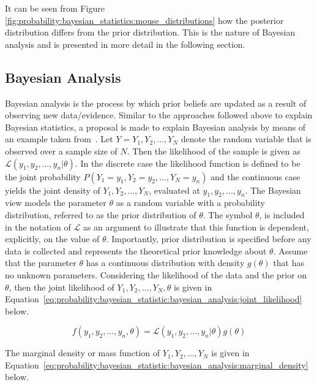 \noindent
It can be seen from Figure \ref{fig:probability:bayesian_statistics:mouse_distributions} how the posterior distribution differs from the prior distribution. This is the nature of Bayesian analysis and is presented in more detail in the following section.

\subsection{Bayesian Analysis}
\label{sec:probability:bayesian_statistics:bayesian_analysis}

Bayesian analysis is the process by which prior beliefs are updated as a result of observing new data/evidence. Similar to the approaches followed above to explain Bayesian statistics, a proposal is made to explain Bayesian analysis by means of an example taken from~\cite{ref:wackerly:2014}. Let $Y = Y_{1}, Y_{2}, \dots, Y_{N}$ denote the random variable that is observed over a sample size of $N$. Then the likelihood of the sample is given as $\mathcal{L}(y_{1}, y_{2}, \dots, y_{n} \vert \theta)$. In the discrete case the likelihood function is defined to be the joint probability $P(Y_{1} = y_{1}, Y_{2} = y_{2}, \dots, Y_{N} = y_{n})$ and the continuous case yields the joint density of $Y_{1}, Y_{2}, \dots, Y_{N}$, evaluated at $y_{1}, y_{2}, \dots, y_{n}$. The Bayesian view models the parameter $\theta$ as a random variable with a probability distribution, referred to as the prior distribution of $\theta$. The symbol $\theta$, is included in the notation of $\mathcal{L}$ as an argument to illustrate that this function is dependent, explicitly, on the value of $\theta$. Importantly, prior distribution is specified before any data is collected and represents the theoretical prior knowledge about $\theta$. Assume that the parameter $\theta$ has a continuous distribution with density $g(\theta)$ that has no unknown parameters. Considering the likelihood of the data and the prior on $\theta$, then the joint likelihood of $Y_{1}, Y_{2}, \dots, Y_{N}, \theta$ is given in Equation~\eqref{eq:probability:bayesian_statistic:bayesian_analysis:joint_likelihood} below.

\begin{equation}
      \label{eq:probability:bayesian_statistic:bayesian_analysis:joint_likelihood}
      f(y_{1}, y_{2}, \dots, y_{n}, \theta) = \mathcal{L}(y_{1}, y_{2}, \dots, y_{n} \vert \theta)g(\theta)
\end{equation}

\noindent
The marginal density or mass function of $Y_{1}, Y_{2}, \dots, Y_{N}$ is given in Equation~\eqref{eq:probability:bayesian_statistic:bayesian_analysis:marginal_density} below.

